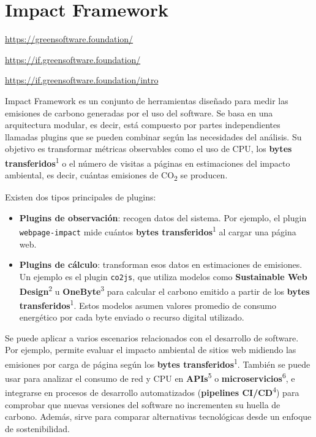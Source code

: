 \documentclass[12pt,a4paper]{report}
\begin{document}
\section*{Impact Framework}

\href{https://greensoftware.foundation/}{https://greensoftware.foundation/}

\href{https://if.greensoftware.foundation/}{https://if.greensoftware.foundation/}

\href{https://if.greensoftware.foundation/intro}{https://if.greensoftware.foundation/intro}

Impact Framework es un conjunto de herramientas diseñado para medir las emisiones de carbono generadas por el uso del software. Se basa en una arquitectura modular, es decir, está compuesto por partes independientes llamadas plugins que se pueden combinar según las necesidades del análisis. Su objetivo es transformar métricas observables como el uso de CPU, los \textbf{bytes transferidos}\textsuperscript{1} o el número de visitas a páginas en estimaciones del impacto ambiental, es decir, cuántas emisiones de CO\textsubscript{2} se producen.

Existen dos tipos principales de plugins:

\begin{itemize}
  \item \textbf{Plugins de observación}: recogen datos del sistema. Por ejemplo, el plugin \texttt{webpage-impact} mide cuántos \textbf{bytes transferidos}\textsuperscript{1} al cargar una página web.
  \item \textbf{Plugins de cálculo}: transforman esos datos en estimaciones de emisiones. Un ejemplo es el plugin \texttt{co2js}, que utiliza modelos como \textbf{Sustainable Web Design}\textsuperscript{2} u \textbf{OneByte}\textsuperscript{3} para calcular el carbono emitido a partir de los \textbf{bytes transferidos}\textsuperscript{1}. Estos modelos asumen valores promedio de consumo energético por cada byte enviado o recurso digital utilizado.
\end{itemize}

Se puede aplicar a varios escenarios relacionados con el desarrollo de software. Por ejemplo, permite evaluar el impacto ambiental de sitios web midiendo las emisiones por carga de página según los \textbf{bytes transferidos}\textsuperscript{1}. También se puede usar para analizar el consumo de red y CPU en \textbf{APIs}\textsuperscript{5} o \textbf{microservicios}\textsuperscript{6}, e integrarse en procesos de desarrollo automatizados (\textbf{pipelines CI/CD}\textsuperscript{4}) para comprobar que nuevas versiones del software no incrementen su huella de carbono. Además, sirve para comparar alternativas tecnológicas desde un enfoque de sostenibilidad.
\end{document}
